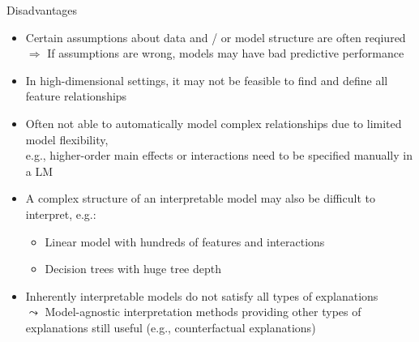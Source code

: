 \documentclass[11pt,compress,t,notes=noshow, aspectratio=169, xcolor=table]{beamer}
\begin{document}
\begin{frame}{Disadvantages}

    \begin{itemize}[<+->]
    \itemsep1em
        \item Certain assumptions about data and / or model structure are often reqiured\\
        $\Rightarrow$ If assumptions are wrong, models may have bad predictive performance
        \item In high-dimensional settings, it may not be feasible to find and define all feature relationships
        \item Often not able to automatically model complex relationships due to limited model flexibility, \\
        e.g., higher-order main effects or interactions need to be specified manually in a LM
        \item A complex structure of an interpretable model may also be difficult to interpret, e.g.:
        \begin{itemize}
            \item Linear model with hundreds of features and interactions 
            \item Decision trees with huge tree depth
        \end{itemize}
        \item Inherently interpretable models do not satisfy all types of explanations\\
        $\leadsto$ Model-agnostic interpretation methods providing other types of explanations still useful (e.g., counterfactual explanations)
    \end{itemize}

\end{frame}
\end{document}
